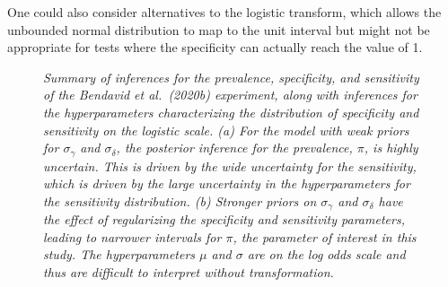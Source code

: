 \documentclass[11pt]{article}
\begin{document}
One could also consider alternatives to the logistic transform, which allows the unbounded normal distribution to map to the unit interval but might not be appropriate for tests where the specificity can actually reach the value of 1.

\begin{figure}
  \caption{\em Summary of inferences for the prevalence, specificity, and sensitivity of the Bendavid et al.\ (2020b) experiment, along with inferences for the hyperparameters characterizing the distribution of specificity and sensitivity on the logistic scale.  (a) For the model with weak priors for $\sigma_{\gamma}$ and $\sigma_{\delta}$, the posterior inference for the prevalence, $\pi$, is highly uncertain.  This is driven by the wide uncertainty for the sensitivity, which is driven by the large uncertainty in the hyperparameters for the sensitivity distribution. (b) Stronger priors on  $\sigma_{\gamma}$ and $\sigma_{\delta}$ have the effect of regularizing the specificity and sensitivity parameters, leading to narrower intervals for $\pi$, the parameter of interest in this study.  The hyperparameters $\mu$ and $\sigma$ are on the log odds scale and thus are difficult to interpret without transformation.}
\label{posterior2}
\end{figure}
\end{document}

